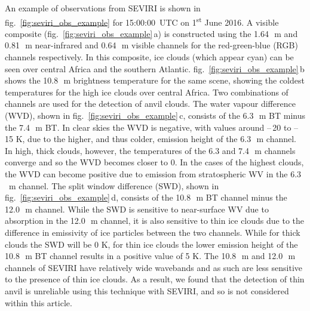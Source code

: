 \documentclass[acp, manuscript]{copernicus}
\begin{document}
%
%
%
%

An example of observations from SEVIRI is shown in fig.~\ref{fig:seviri_obs_example} for 15:00:00~UTC on 1\textsuperscript{st} June 2016. 
A visible composite (fig.~\ref{fig:seviri_obs_example}\,a) is constructed using the 1.64\,\unit{\mu m} and 0.81\,\unit{\mu m} near-infrared and 0.64\,\unit{\mu m} visible channels for the red-green-blue (RGB) channels respectively. 
In this composite, ice clouds (which appear cyan) can be seen over central Africa and the southern Atlantic. fig.~\ref{fig:seviri_obs_example}\,b shows the 10.8\,\unit{\mu m} brightness temperature for the same scene, showing the coldest temperatures for the high ice clouds over central Africa. 
Two combinations of channels are used for the detection of anvil clouds. 
The water vapour difference (WVD), shown in fig.~\ref{fig:seviri_obs_example}\,c, consists of the 6.3\,\unit{\mu m} BT minus the 7.4\,\unit{\mu m} BT. 
In clear skies the WVD is negative, with values around --\,20 to --\,15 K, due to the higher, and thus colder, emission height of the 6.3\,\unit{\mu m} channel. 
In high, thick clouds, however, the temperatures of the 6.3 and 7.4\,\unit{\mu m} channels converge and so the WVD becomes closer to 0. 
In the cases of the highest clouds, the WVD can become positive due to emission from stratospheric WV in the 6.3\,\unit{\mu m} channel. The split window difference (SWD), shown in fig.~\ref{fig:seviri_obs_example}\,d, consists of the 10.8\,\unit{\mu m} BT channel minus the 12.0\,\unit{\mu m} channel. 
While the SWD is sensitive to near-surface WV due to absorption in the 12.0\,\unit{\mu m} channel, it is also sensitive to thin ice clouds due to the difference in emissivity of ice particles between the two channels. 
While for thick clouds the SWD will be 0 K, for thin ice clouds the lower emission height of the 10.8\,\unit{\mu m} BT channel results in a positive value of 5 K.
The 10.8\,\unit{\mu m} and 12.0\,\unit{\mu m} channels of SEVIRI have relatively wide wavebands and as such are less sensitive to the presence of thin ice clouds.
As a result, we found that the detection of thin anvil is unreliable using this technique with SEVIRI, and so is not considered within this article.
\end{document}
